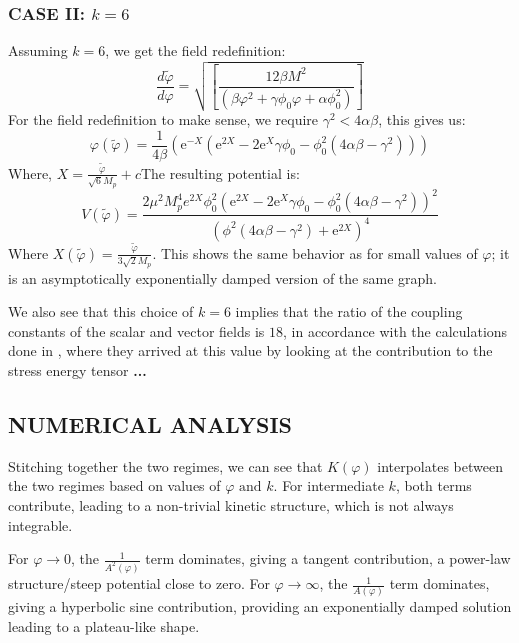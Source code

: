 \documentclass[aps,prd,reprint,preprintnumbers,showpacs,floatfix,nofootinbib,superscript address]{revtex4-2}
\begin{document}
\subsubsection{\textbf{CASE II}: $k = 6$}
Assuming $k=6$,  we get the field redefinition:
\begin{equation}
    \frac{d\tilde{\varphi}}{d\varphi} = \sqrt{\left[\frac{12\beta M^2}{(\beta \varphi^2 + \gamma\phi_0\varphi + \alpha \phi_0^2)} \right]}
\end{equation}
For the field redefinition to make sense, we require $\gamma^2 < 4\alpha \beta$, this gives us:
\begin{equation}
    \varphi(\tilde{\varphi}) = \frac{1}{4\beta} \left(\text{e}^{-X}(\text{e}^{2X} - 2\text{e}^X \gamma \phi_0 - \phi_0^2(4\alpha\beta-\gamma^2)) \right)
\end{equation}
Where, $X = \frac{\tilde{\varphi}}{\sqrt{6}M_p}+c$The resulting potential is:
\begin{equation}
    V(\tilde{\varphi}) =  \frac{2 \mu ^2 M_p^4 e^{2 X} \phi_0^2 \left(\text{e}^{2X} - 2\text{e}^X \gamma \phi_0 - \phi_0^2(4\alpha\beta-\gamma^2)\right)^2}{\left(\phi ^2 \left(4 \alpha  \beta -\gamma ^2\right)+\text{e}^{2 X}\right)^4}
\end{equation}
Where $X(\tilde{\varphi}) = \frac{\tilde{\varphi}}{3\sqrt{2}M_p}$. This shows the same behavior as \cite{barker2024poincaregaugetheoryconformal} for small values of $\varphi$; it is an asymptotically exponentially damped version of the same graph.

We also see that this choice of $k = 6$ implies that the ratio of the coupling constants of the scalar and vector fields is $18$, in accordance with the calculations done in \cite{doi:10.1098/rspa.1977.0151}, where they arrived at this value by looking at the contribution to the stress energy tensor \textbf{...}

\subsection{\textbf{NUMERICAL ANALYSIS}}
Stitching together the two regimes, we can see that $K(\varphi)$ interpolates between the two regimes based on values of $\varphi \, \, \text{and}\, \,k$. For intermediate $k$, both terms contribute, leading to a non-trivial kinetic structure, which is not always integrable.

For $\varphi \rightarrow 0$, the $\frac{1}{A^2(\varphi)}$ term dominates, giving a tangent contribution, a power-law structure/steep potential close to zero. For $\varphi \rightarrow \infty$, the $\frac{1}{A(\varphi)}$ term dominates,  giving a hyperbolic sine contribution, providing an exponentially damped solution leading to a plateau-like shape. 
\end{document}
